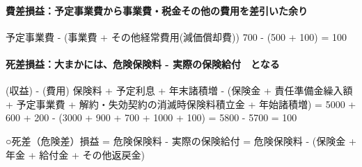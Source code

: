 \documentclass[report,gutter=10mm,fore-edge=10mm,uplatex,dvipdfmx]{jlreq}
\begin{document}
\paragraph{費差損益：予定事業費から事業費・税金その他の費用を差引いた余り}

予定事業費 - (事業費 + その他経常費用(減価償却費)) 700 - (500 + 100) =
100

\paragraph{死差損益：大まかには、危険保険料 -
実際の保険給付　となる}

(収益) - (費用) 保険料 + 予定利息 + 年末諸積増 - (保険金 +
責任準備金繰入額 + 予定事業費 + 解約・失効契約の消滅時保険料積立金 +
年始諸積増) = 5000 + 600 + 200 - (3000 + 900 + 700 + 1000 + 100) = 5800
- 5700 = 100

○死差（危険差）損益 = 危険保険料 - 実際の保険給付 = 危険保険料 - (保険金
+ 年金 + 給付金 + その他返戻金)
\end{document}
